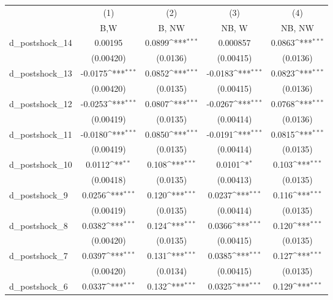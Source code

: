 {
\def\sym#1{\ifmmode^{#1}\else\(^{#1}\)\fi}
\begin{tabular}{l*{4}{c}}
\hline\hline
          &\multicolumn{1}{c}{(1)}&\multicolumn{1}{c}{(2)}&\multicolumn{1}{c}{(3)}&\multicolumn{1}{c}{(4)}\\
          &\multicolumn{1}{c}{B,W}&\multicolumn{1}{c}{B, NW}&\multicolumn{1}{c}{NB, W}&\multicolumn{1}{c}{NB, NW}\\
\hline
d\_postshock\_14&  0.00195         &   0.0899\sym{***}& 0.000857         &   0.0863\sym{***}\\
          &(0.00420)         & (0.0136)         &(0.00415)         & (0.0136)         \\
d\_postshock\_13&  -0.0175\sym{***}&   0.0852\sym{***}&  -0.0183\sym{***}&   0.0823\sym{***}\\
          &(0.00420)         & (0.0135)         &(0.00415)         & (0.0136)         \\
d\_postshock\_12&  -0.0253\sym{***}&   0.0807\sym{***}&  -0.0267\sym{***}&   0.0768\sym{***}\\
          &(0.00419)         & (0.0135)         &(0.00414)         & (0.0136)         \\
d\_postshock\_11&  -0.0180\sym{***}&   0.0850\sym{***}&  -0.0191\sym{***}&   0.0815\sym{***}\\
          &(0.00419)         & (0.0135)         &(0.00414)         & (0.0135)         \\
d\_postshock\_10&   0.0112\sym{**} &    0.108\sym{***}&   0.0101\sym{*}  &    0.103\sym{***}\\
          &(0.00418)         & (0.0135)         &(0.00413)         & (0.0135)         \\
d\_postshock\_9&   0.0256\sym{***}&    0.120\sym{***}&   0.0237\sym{***}&    0.116\sym{***}\\
          &(0.00419)         & (0.0135)         &(0.00414)         & (0.0135)         \\
d\_postshock\_8&   0.0382\sym{***}&    0.124\sym{***}&   0.0366\sym{***}&    0.120\sym{***}\\
          &(0.00420)         & (0.0135)         &(0.00415)         & (0.0135)         \\
d\_postshock\_7&   0.0397\sym{***}&    0.131\sym{***}&   0.0385\sym{***}&    0.127\sym{***}\\
          &(0.00420)         & (0.0134)         &(0.00415)         & (0.0135)         \\
d\_postshock\_6&   0.0337\sym{***}&    0.132\sym{***}&   0.0325\sym{***}&    0.129\sym{***}\\

\end{tabular}}
